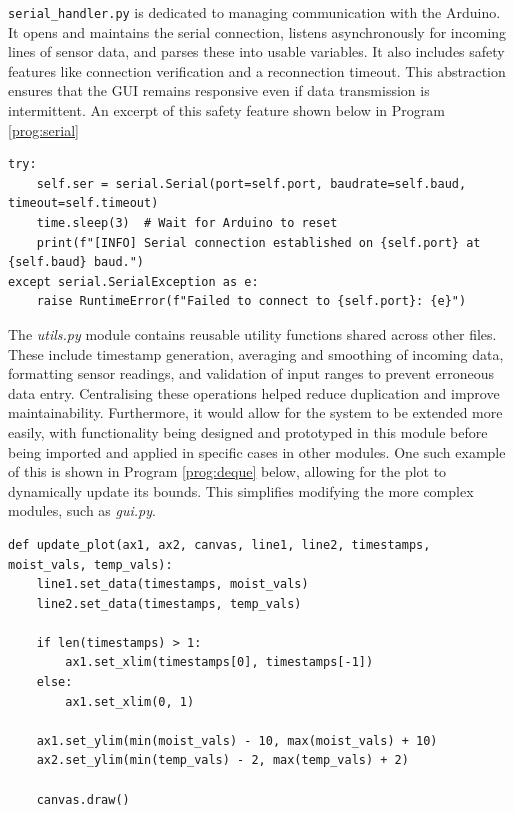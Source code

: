 \documentclass[a4paper,11pt]{article}
\begin{document}
\texttt{serial\_handler.py} is dedicated to managing communication with the Arduino. 
It opens and maintains the serial connection, 
listens asynchronously for incoming lines of sensor data, 
and parses these into usable variables. 
It also includes safety features like 
connection verification and a reconnection timeout. 
This abstraction ensures that the GUI remains responsive 
even if data transmission is intermittent.
An excerpt of this safety feature shown below in Program \ref{prog:serial}

\begin{lstlisting}[style=python-style, 
caption={LED warning light}, label={prog:serial}]
try:
    self.ser = serial.Serial(port=self.port, baudrate=self.baud, timeout=self.timeout)
    time.sleep(3)  # Wait for Arduino to reset
    print(f"[INFO] Serial connection established on {self.port} at {self.baud} baud.")
except serial.SerialException as e:
    raise RuntimeError(f"Failed to connect to {self.port}: {e}")
\end{lstlisting}

The \textit{utils.py} module contains reusable utility functions 
shared across other files. 
These include timestamp generation, averaging and smoothing of incoming data, 
formatting sensor readings, and validation of input ranges to prevent erroneous data entry. 
Centralising these operations helped reduce duplication and improve maintainability.
Furthermore, it would allow for the system to be extended more easily,
with functionality being designed and prototyped in this module 
before being imported and applied in specific cases in other modules.
One such example of this is shown in Program \ref{prog:deque} below,
allowing for the plot to dynamically update its bounds.
This simplifies modifying the more complex modules,
such as \textit{gui.py}.

\begin{lstlisting}[style=python-style, 
caption={Update Plot function}, label={prog:deque}]
def update_plot(ax1, ax2, canvas, line1, line2, timestamps, moist_vals, temp_vals):
    line1.set_data(timestamps, moist_vals)
    line2.set_data(timestamps, temp_vals)

    if len(timestamps) > 1:
        ax1.set_xlim(timestamps[0], timestamps[-1])
    else:
        ax1.set_xlim(0, 1)

    ax1.set_ylim(min(moist_vals) - 10, max(moist_vals) + 10)
    ax2.set_ylim(min(temp_vals) - 2, max(temp_vals) + 2)

    canvas.draw()
\end{lstlisting}
\end{document}
